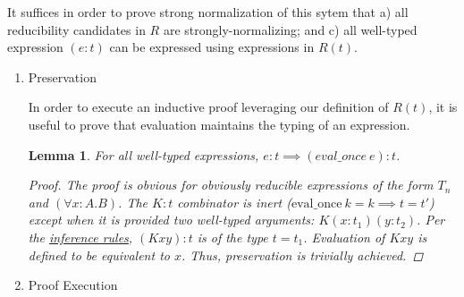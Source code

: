 \documentclass[11pt]{article}
\newtheorem{lemma}[theorem]{Lemma}
\begin{document}
It suffices in order to prove strong normalization of this sytem that a) all reducibility candidates in \(R\) are strongly-normalizing; and c) all well-typed expression \((e : t)\) can be expressed using expressions in \(R(t)\).
\begin{enumerate}
\item Preservation
\label{sec:org641e1b6}

In order to execute an inductive proof leveraging our definition of \(R(t)\), it is useful to prove that evaluation maintains the typing of an expression.

\begin{lemma}
For all well-typed expressions, $e : t \implies (eval\_once\ e) : t$.
\begin{proof}
The proof is obvious for obviously reducible expressions of the form $T_{n}$ and $(\forall x:A.B)$. The $K : t$ combinator is inert ($\text{eval\_once}\ k = k \implies t = t'$) except when it is provided two well-typed arguments: $K (x : t_{1}) (y : t_{2})$. Per the \href{inference:1}{inference rules}, $(K x y) : t$ is of the type $t = t_{1}$. Evaluation of $K x y$ is defined to be equivalent to $x$. Thus, preservation is trivially achieved.
\end{proof}
\end{lemma}
\item Proof Execution
\label{sec:org2c32c12}


\end{enumerate}
\end{document}
